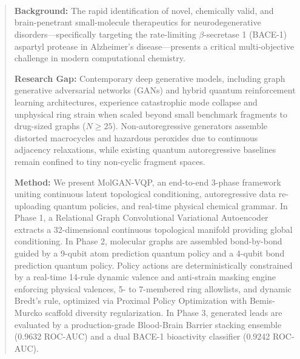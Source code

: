 \documentclass[10pt,a4paper]{article}
\begin{document}
\\[0.40cm]

\\[0.20cm]

\\[0.35cm]
\begin{abstract}
\noindent\textbf{Background:} The rapid identification of novel, chemically valid, and brain-penetrant small-molecule therapeutics for neurodegenerative disorders---specifically targeting the rate-limiting $\beta$-secretase 1 (BACE-1) aspartyl protease in Alzheimer's disease---presents a critical multi-objective challenge in modern computational chemistry.

\noindent\textbf{Research Gap:} Contemporary deep generative models, including graph generative adversarial networks (GANs) and hybrid quantum reinforcement learning architectures, experience catastrophic mode collapse and unphysical ring strain when scaled beyond small benchmark fragments to drug-sized graphs ($N \ge 25$). Non-autoregressive generators assemble distorted macrocycles and hazardous peroxides due to continuous adjacency relaxations, while existing quantum autoregressive baselines remain confined to tiny non-cyclic fragment spaces.

\noindent\textbf{Method:} We present MolGAN-VQP, an end-to-end 3-phase framework uniting continuous latent topological conditioning, autoregressive data re-uploading quantum policies, and real-time physical chemical grammar. In Phase 1, a Relational Graph Convolutional Variational Autoencoder extracts a 32-dimensional continuous topological manifold providing global conditioning. In Phase 2, molecular graphs are assembled bond-by-bond guided by a 9-qubit atom prediction quantum policy and a 4-qubit bond prediction quantum policy. Policy actions are deterministically constrained by a real-time 14-rule dynamic valence and anti-strain masking engine enforcing physical valences, 5- to 7-membered ring allowlists, and dynamic Bredt's rule, optimized via Proximal Policy Optimization with Bemis-Murcko scaffold diversity regularization. In Phase 3, generated leads are evaluated by a production-grade Blood-Brain Barrier stacking ensemble (0.9632 ROC-AUC) and a dual BACE-1 bioactivity classifier (0.9242 ROC-AUC).


\end{abstract}
\end{document}
